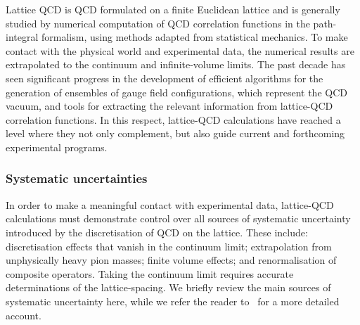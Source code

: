Lattice QCD is QCD formulated on a finite Euclidean lattice and is generally
studied by numerical computation of QCD correlation functions in the
path-integral formalism, using methods adapted from statistical
mechanics.
%
To make contact with the physical world and experimental
data, the numerical results are extrapolated to the continuum 
and infinite-volume limits.
%
The past decade has seen significant progress in
the development of efficient algorithms for the generation of
ensembles of gauge field configurations, which represent the QCD
vacuum, and tools for extracting the relevant information from lattice-QCD
correlation functions.
%
In this respect, lattice-QCD calculations have reached a level where
they not only complement, but also guide current and forthcoming
experimental programs.

\subsubsection{Systematic uncertainties}
In order to make a meaningful contact with experimental data, lattice-QCD 
calculations must demonstrate control over all sources of systematic 
uncertainty introduced by the discretisation of QCD on the lattice.
%
These include: discretisation effects that vanish in the continuum limit;
extrapolation from unphysically heavy pion masses; finite volume
effects; and renormalisation of composite operators.
%
Taking the continuum limit requires accurate determinations of the 
lattice-spacing. 
%
We briefly review the main sources of systematic uncertainty here, while we 
refer the reader to~\cite{Aoki:2016frl} for a more detailed account.

